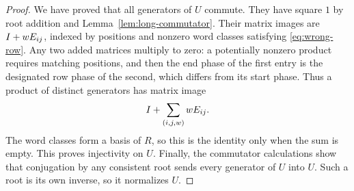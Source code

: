 \begin{proof}
We have proved that all generators of $U$ commute. They have square
$1$ by root addition and Lemma~\ref{lem:long-commutator}. Their
matrix images are $I+wE_{ij}$, indexed by positions and nonzero
word classes satisfying \eqref{eq:wrong-row}. Any two added matrices
multiply to zero: a potentially nonzero product requires matching
positions, and then the end phase of the first entry is the designated
row phase of the second, which differs from its start phase. Thus a
product of distinct generators has matrix image
\[
 I+\sum_{(i,j,w)}wE_{ij}.
\]
The word classes form a basis of $R$, so this is the identity only
when the sum is empty. This proves injectivity on $U$.
Finally, the commutator calculations show that conjugation by any
consistent root sends every generator of $U$ into $U$. Such a root
is its own inverse, so it normalizes $U$.
\end{proof}
